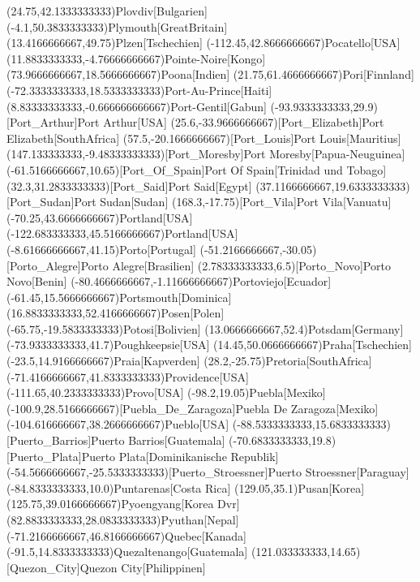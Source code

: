 \mapput(24.75,42.1333333333){Plovdiv}[Bulgarien]
\mapput(-4.1,50.3833333333){Plymouth}[GreatBritain]
\mapput(13.4166666667,49.75){Plzen}[Tschechien]
\mapput(-112.45,42.8666666667){Pocatello}[USA]
\mapput(11.8833333333,-4.76666666667){Pointe-Noire}[Kongo]
\mapput(73.9666666667,18.5666666667){Poona}[Indien]
\mapput(21.75,61.4666666667){Pori}[Finnland]
\mapput(-72.3333333333,18.5333333333){Port-Au-Prince}[Haiti]
\mapput(8.83333333333,-0.666666666667){Port-Gentil}[Gabun]
\mapput(-93.9333333333,29.9)[Port_Arthur]{Port Arthur}[USA]
\mapput(25.6,-33.9666666667)[Port_Elizabeth]{Port Elizabeth}[SouthAfrica]
\mapput(57.5,-20.1666666667)[Port_Louis]{Port Louis}[Mauritius]
\mapput(147.133333333,-9.48333333333)[Port_Moresby]{Port Moresby}[Papua-Neuguinea]
\mapput(-61.5166666667,10.65)[Port_Of_Spain]{Port Of Spain}[Trinidad und Tobago]
\mapput(32.3,31.2833333333)[Port_Said]{Port Said}[Egypt]
\mapput(37.1166666667,19.6333333333)[Port_Sudan]{Port Sudan}[Sudan]
\mapput(168.3,-17.75)[Port_Vila]{Port Vila}[Vanuatu]
\mapput(-70.25,43.6666666667){Portland}[USA]
\mapput(-122.683333333,45.5166666667){Portland}[USA]
\mapput(-8.61666666667,41.15){Porto}[Portugal]
\mapput(-51.2166666667,-30.05)[Porto_Alegre]{Porto Alegre}[Brasilien]
\mapput(2.78333333333,6.5)[Porto_Novo]{Porto Novo}[Benin]
\mapput(-80.4666666667,-1.11666666667){Portoviejo}[Ecuador]
\mapput(-61.45,15.5666666667){Portsmouth}[Dominica]
\mapput(16.8833333333,52.4166666667){Posen}[Polen]
\mapput(-65.75,-19.5833333333){Potosi}[Bolivien]
\mapput(13.0666666667,52.4){Potsdam}[Germany]
\mapput(-73.9333333333,41.7){Poughkeepsie}[USA]
\mapput(14.45,50.0666666667){Praha}[Tschechien]
\mapput(-23.5,14.9166666667){Praia}[Kapverden]
\mapput(28.2,-25.75){Pretoria}[SouthAfrica]
\mapput(-71.4166666667,41.8333333333){Providence}[USA]
\mapput(-111.65,40.2333333333){Provo}[USA]
\mapput(-98.2,19.05){Puebla}[Mexiko]
\mapput(-100.9,28.5166666667)[Puebla_De_Zaragoza]{Puebla De Zaragoza}[Mexiko]
\mapput(-104.616666667,38.2666666667){Pueblo}[USA]
\mapput(-88.5333333333,15.6833333333)[Puerto_Barrios]{Puerto Barrios}[Guatemala]
\mapput(-70.6833333333,19.8)[Puerto_Plata]{Puerto Plata}[Dominikanische Republik]
\mapput(-54.5666666667,-25.5333333333)[Puerto_Stroessner]{Puerto Stroessner}[Paraguay]
\mapput(-84.8333333333,10.0){Puntarenas}[Costa Rica]
\mapput(129.05,35.1){Pusan}[Korea]
\mapput(125.75,39.0166666667){Pyoengyang}[Korea Dvr]
\mapput(82.8833333333,28.0833333333){Pyuthan}[Nepal]
\mapput(-71.2166666667,46.8166666667){Quebec}[Kanada]
\mapput(-91.5,14.8333333333){Quezaltenango}[Guatemala]
\mapput(121.033333333,14.65)[Quezon_City]{Quezon City}[Philippinen]
